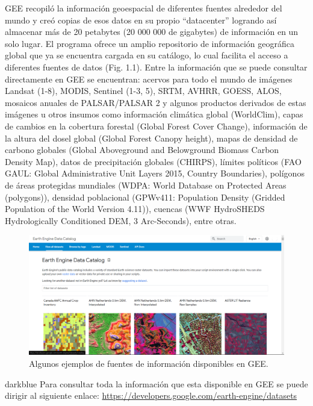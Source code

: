 \documentclass[
  12pt,
  letterpaper,
  twoside]{book}
\begin{document}
GEE recopiló la información geoespacial de diferentes fuentes alrededor del mundo y creó copias de esos datos en su propio ``datacenter'' logrando así almacenar más de 20 petabytes (20 000 000 de gigabytes) de información en un solo lugar. El programa ofrece un amplio repositorio de información geográfica global que ya se encuentra cargada en su catálogo, lo cual facilita el acceso a diferentes fuentes de datos (Fig. 1.1). Entre la información que se puede consultar directamente en GEE se encuentran: acervos para todo el mundo de imágenes Landsat (1-8), MODIS, Sentinel (1-3, 5), SRTM, AVHRR, GOESS, ALOS, mosaicos anuales de PALSAR/PALSAR 2 y algunos productos derivados de estas imágenes u otros insumos como información climática global (WorldClim), capas de cambios en la cobertura forestal (Global Forest Cover Change), información de la altura del dosel global (Global Forest Canopy height), mapas de densidad de carbono globales (Global Aboveground and Belowground Biomass Carbon Density Map), datos de precipitación globales (CHIRPS), límites políticos (FAO GAUL: Global Administrative Unit Layers 2015, Country Boundaries), polígonos de áreas protegidas mundiales (WDPA: World Database on Protected Areas (polygons)), densidad poblacional (GPWv411: Population Density (Gridded Population of the World Version 4.11)), cuencas (WWF HydroSHEDS Hydrologically Conditioned DEM, 3 Arc-Seconds), entre otras.

\begin{figure}[btp]

{\centering \includegraphics[width=1\linewidth]{Img/Datasets} 

}

\caption{Algunos ejemplos de fuentes de información disponibles en GEE.}\label{fig:unnamed-chunk-1}
\end{figure}

\begin{bluebox2}

\begin{awesomeblock}{5pt}{\faLightbulb}{darkblue}
Para consultar toda la información que esta disponible en GEE se puede dirigir al siguiente enlace: \url{https://developers.google.com/earth-engine/datasets}

\end{awesomeblock}

\end{bluebox2}
\end{document}
